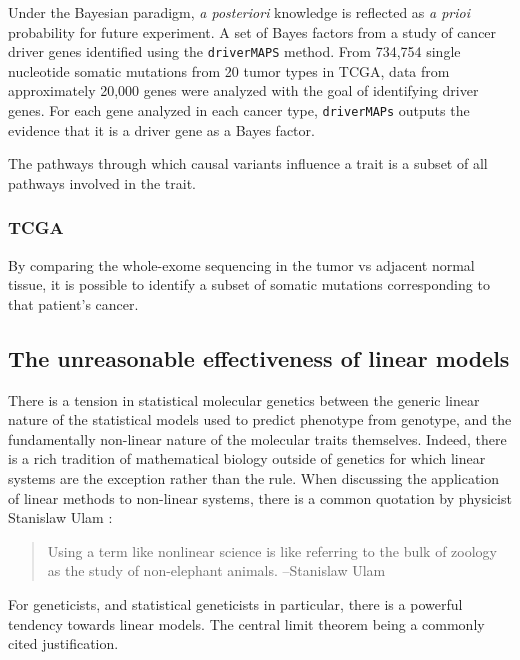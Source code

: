 Under the Bayesian paradigm, \emph{a posteriori} knowledge is reflected as \emph{a prioi} probability for future experiment.  A set of Bayes factors from a study of cancer driver genes identified using the \texttt{driverMAPS} method\cite{drivermaps}.  From 734,754 single nucleotide somatic mutations from 20 tumor types in TCGA, data from approximately 20,000 genes were analyzed with the goal of identifying driver genes. For each gene analyzed in each cancer type, \texttt{driverMAPs} outputs the evidence that it is a driver gene as a Bayes factor.

The pathways through which causal variants influence a trait is a subset of all pathways involved in the trait.



\subsubsection{TCGA}

By comparing the whole-exome sequencing in the tumor vs adjacent normal tissue, it is possible to identify a subset of somatic mutations corresponding to that patient's cancer.

\subsection{The unreasonable effectiveness of linear models}\label{sec:orgd56a398}

There is a tension in statistical molecular genetics between the generic linear nature of the statistical models used to predict phenotype from genotype, and the fundamentally non-linear nature of the molecular traits themselves.  Indeed, there is a 
rich tradition of mathematical biology outside of genetics for which linear systems are the exception rather than the rule.  When discussing the application of linear methods to non-linear systems, there is a common quotation by physicist Stanislaw Ulam \cite{Campbell_2004} :

\begin{quote}
Using a term like nonlinear science is like referring to the bulk of zoology as the study of non-elephant animals. --Stanislaw Ulam
\end{quote}

For geneticists, and statistical geneticists in particular, there is a powerful tendency towards linear models.  The central limit theorem being a commonly cited justification.


